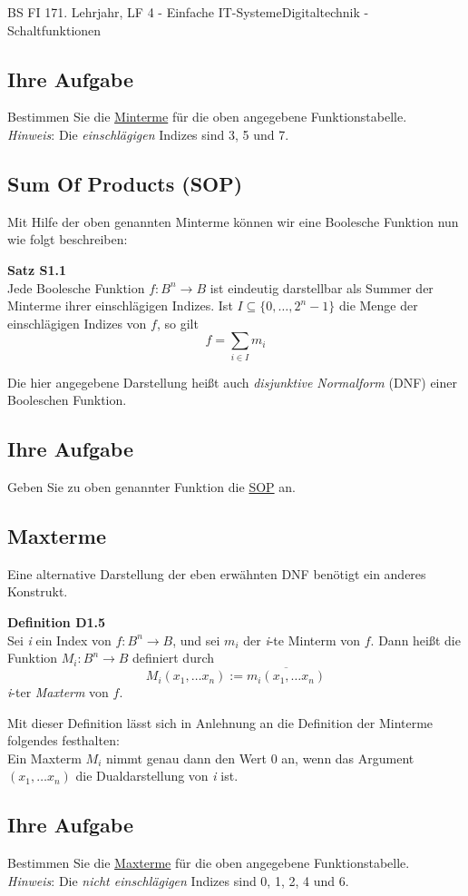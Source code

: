 \documentclass[11pt,twocolumn,oneside,openany,headings=optiontotoc,11pt,numbers=noenddot]{article}
\begin{document}
\begin{worksheet}{BS FI 17}{1. Lehrjahr, LF 4 - Einfache IT-Systeme}{Digitaltechnik - Schaltfunktionen}
		\subsection*{Ihre Aufgabe} Bestimmen Sie die \underline{Minterme} für die oben angegebene Funktionstabelle.\\
		\textit{Hinweis}: Die \textit{einschlägigen} Indizes sind 3, 5 und 7.
		\subsection{Sum Of Products (SOP)} Mit Hilfe der oben genannten Minterme können wir eine Boolesche Funktion nun wie folgt beschreiben:
		\begin{framed}
			\textbf{Satz S1.1}\\ Jede Boolesche Funktion \(f: B^n \rightarrow B\) ist eindeutig darstellbar als Summer der Minterme ihrer einschlägigen Indizes. Ist \(I \subseteq \{0,\ldots , 2^n -1\}\) die Menge der einschlägigen Indizes von \(f\), so gilt
			\[f = \sum_{i\in I} m_i\]
		\end{framed}
		Die hier angegebene Darstellung heißt auch \textit{disjunktive Normalform} (DNF) einer Booleschen Funktion.
		\subsection*{Ihre Aufgabe} Geben Sie zu oben genannter Funktion die \underline{SOP} an.
		\subsection{Maxterme} Eine alternative Darstellung der eben erwähnten DNF benötigt ein anderes Konstrukt.
		\begin{framed}
			\textbf{Definition D1.5}\\Sei \textit{i} ein Index von \(f:B^n\rightarrow B\), und sei \(m_i\) der \textit{i}-te Minterm von \(f\). Dann heißt die Funktion \(M_i: B^n \rightarrow B\) definiert durch
			\[M_i(x_1,\ldots x_n) := \overline{m_i(x_1,\ldots x_n)}\]
			\textit{i}-ter \textit{Maxterm} von \(f\).
		\end{framed}
		Mit dieser Definition lässt sich in Anlehnung an die Definition der Minterme folgendes festhalten:\\ Ein Maxterm \(M_i\) nimmt genau dann den Wert 0 an, wenn das Argument \((x_1,\ldots x_n)\) die Dualdarstellung von \textit{i} ist.
		\subsection*{Ihre Aufgabe} Bestimmen Sie die \underline{Maxterme} für die oben angegebene Funktionstabelle.\\
		\textit{Hinweis}: Die \textit{nicht einschlägigen} Indizes sind 0, 1, 2, 4 und 6.

\end{worksheet}
\end{document}
